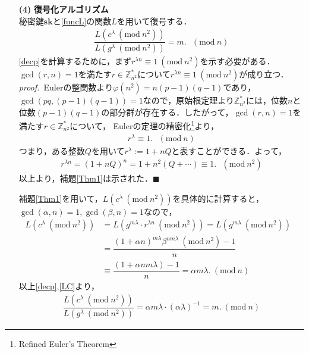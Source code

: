 \documentclass[a4paper]{jsarticle}
\begin{document}
\begin{enumerate}
\item[\textbf{(4)}]\textbf{復号化アルゴリズム}\\
秘密鍵$\bm{sk}$と\ref{funcL}の関数$L$を用いて復号する．
\begin{align*}
\label{decp}
\dfrac{L(c^\lambda\ (\mathrm{mod}\  n^2))}{L(g^\lambda\ (\mathrm{mod}\  n^2))}  = m.\ \ \ (\mathrm{mod}\  n)\tag*{(5)}
\end{align*}
\ref{decp}を計算するために，まず$r^{\lambda n} \equiv 1 \ (\mathrm{mod}\  n^2)$を示す必要がある．
\Lem \label{Thm1}$\gcd(r,n) = 1$を満たす$r\in\mathbb{Z}^{*}_{n^2}$について$r^{\lambda n} \equiv 1 \ (\mathrm{mod}\  n^2)$が成り立つ．\\
\textit{proof.\ }Eulerの整関数より$\varphi(n^2) = n(p-1)(q-1)$であり，$\gcd(pq,(p-1)(q-1)) = 1$なので，原始根定理より$\mathbb{Z}^{*}_{n^2}$には，位数$n$と位数$(p-1)(q-1)$の部分群が存在する．したがって，$\gcd(r,n) = 1$を満たす$r\in\mathbb{Z}^{*}_{n^2}$について， Eulerの定理の精密化\footnote{Refined Euler's Theorem}より，
\begin{align*}
r^\lambda\equiv 1.\ \ \ (\mathrm{mod}\  n)\tag*{(6)}
\end{align*}
つまり，ある整数$Q$を用いて$r^\lambda:=1 + nQ$と表すことができる．よって，
\begin{align*}
r^{\lambda n} = (1 + nQ)^n = 1 + n^2 (Q +\cdots) \equiv 1.\ \ \ (\mathrm{mod}\  n^2)\tag*{(7)}
\end{align*}
以上より，補題\ref{Thm1}は示された．$\blacksquare$


補題\ref{Thm1}を用いて，$L(c^\lambda\ (\mathrm{mod}\  n^2))$を具体的に計算すると，$\gcd(\alpha, n) = 1, \gcd(\beta, n) = 1$なので，
\begin{align*}
\label{LC}
L(c^\lambda\ (\mathrm{mod}\  n^2)) &= L(g^{m\lambda}\cdot r^{\lambda n}\ (\mathrm{mod}\  n^2))=L(g^{m\lambda}\ (\mathrm{mod}\  n^2))&\\
&= \dfrac{(1+\alpha n)^{m\lambda}\beta^{nm\lambda}\ (\mathrm{mod}\  n^2)-1}{n}&\\
&\equiv\dfrac{(1 + \alpha nm\lambda)-1}{n}=\alpha m\lambda.\ (\mathrm{mod}\  n)\tag*{(8)}&
\end{align*}
以上\ref{decp},\ref{LC}より，
\begin{align*}
\dfrac{L(c^\lambda\ (\mathrm{mod}\  n^2))}{L(g^\lambda\ (\mathrm{mod}\  n^2))} = \alpha m\lambda\cdot(\alpha\lambda)^{-1} = m.\ (\mathrm{mod}\  n)\tag*{(9)}
\end{align*}


\end{enumerate}
\end{document}
